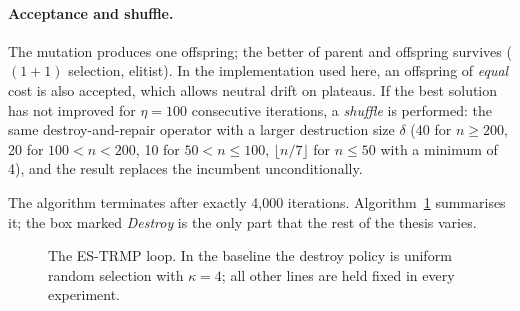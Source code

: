 \paragraph{Acceptance and shuffle.} The mutation produces one offspring; the better of parent and offspring survives ($(1+1)$ selection, elitist). In the implementation used here, an offspring of \emph{equal} cost is also accepted, which allows neutral drift on plateaus. If the best solution has not improved for $\eta=100$ consecutive iterations, a \emph{shuffle} is performed: the same destroy-and-repair operator with a larger destruction size $\delta$ (40 for $n\ge200$, 20 for $100<n<200$, 10 for $50<n\le100$, $\lfloor n/7\rfloor$ for $n\le50$ with a minimum of 4), and the result replaces the incumbent unconditionally.

The algorithm terminates after exactly 4{,}000 iterations. Algorithm~\ref{alg:es} summarises it; the box marked \emph{Destroy} is the only part that the rest of the thesis varies.

\begin{figure}[htbp]
\centering
{}
\caption{The ES-TRMP loop. In the baseline the destroy policy is uniform random selection with $\kappa=4$; all other lines are held fixed in every experiment.}
\label{alg:es}
\end{figure}

